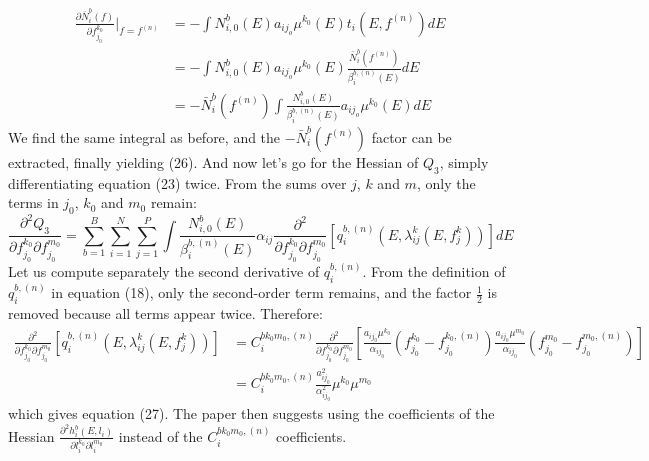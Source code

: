\documentclass[a4paper, 10pt]{article}
\begin{document}
\begin{equation*}
 \begin{split}
   \frac{\partial \bar{N}^b_i(f)}{\partial f_{j_0}^{k_0}}\Bigr|_{f = f^{(n)}} &= - \int N_{i,0}^b(E) a_{ij_o} \mu^{k_0}(E) t_i\left( E, f^{(n)}\right) dE \\
   &= - \int N_{i,0}^b(E) a_{ij_o} \mu^{k_0}(E) \frac{\bar{N}_i^b(f^{(n)})}{\beta_i^{b, (n)}(E)}dE \\
   &= - \bar{N}_i^b(f^{(n)}) \int \frac{N_{i,0}^b(E)}{\beta_i^{b, (n)}(E)} a_{ij_o} \mu^{k_0}(E) dE
 \end{split}
\end{equation*}
We find the same integral as before, and the $- \bar{N}_i^b(f^{(n)})$ factor can be extracted, finally yielding (26).
And now let's go for the Hessian of $Q_3$, simply differentiating equation (23) twice. From the sums over $j$, $k$ and $m$, only the terms in $j_0$, $k_0$ and $m_0$ remain:
\begin{equation*}
  \frac{\partial^2 Q_3}{\partial f_{j_0}^{k_0}\partial f_{j_0}^{m_0}} =  \sum_{b=1}^B \sum_{i=1}^N \sum_{j=1}^P \int \frac{N_{i,0}^b(E)}{\beta_i^{b, (n)}(E)} \alpha_{ij} \frac{\partial^2}{\partial f_{j_0}^{k_0}\partial f_{j_0}^{m_0}} \left[ q_i^{b, (n)}\left(E, \lambda_{ij}^k\left( E, f_j^k\right)\right) \right] dE
\end{equation*}
Let us compute separately the second derivative of $q_i^{b, (n)}$. From the definition of $q_i^{b, (n)}$ in equation (18), only the second-order term remains, and the factor $\frac{1}{2}$ is removed because all terms appear twice. 
Therefore:
\begin{equation*}
\begin{split}
  \frac{\partial^2}{\partial f_{j_0}^{k_0}\partial f_{j_0}^{m_0}} \left[ q_i^{b, (n)}\left(E, \lambda_{ij}^k\left( E, f_j^k\right)\right) \right] &= C_i^{bk_0m_0, (n)} \frac{\partial^2}{\partial f_{j_0}^{k_0}\partial f_{j_0}^{m_0}} \left[ \frac{a_{ij_0}\mu^{k_0}}{\alpha_{ij_0}} \left( f_{j_0}^{k_0} - f_{j_0}^{k_0, (n)} \right) \frac{a_{ij_0}\mu^{m_0}}{\alpha_{ij_0}} \left( f_{j_0}^{m_0} - f_{j_0}^{m_0, (n)} \right) \right] \\
  &= C_i^{bk_0m_0, (n)} \frac{a_{ij_0}^2}{\alpha_{ij_0}^2} \mu^{k_0}\mu^{m_0}
\end{split}
\end{equation*}
which gives equation (27). The paper then suggests using the coefficients of the Hessian $\frac{\partial^2 h_i^b(E, l_i)}{\partial l_i^{k_0}\partial l_i^{m_0}}$ instead of the $C_i^{bk_0m_0, (n)}$ coefficients. 
\end{document}
